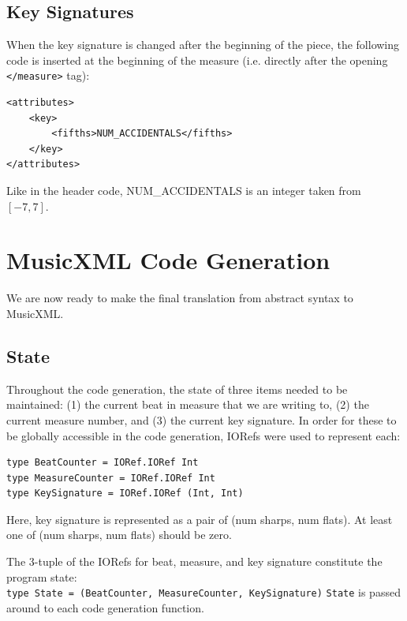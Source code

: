 \documentclass{report}
\begin{document}
\subsection{Key Signatures}
\label{sec:xmlkeysig}
When the  key signature is changed after the beginning of the piece, the following  code is inserted at the beginning of the measure (i.e. directly after the opening \verb.</measure>. tag):

\begin{verbatim}
<attributes>
    <key>
        <fifths>NUM_ACCIDENTALS</fifths>
    </key>
</attributes>
\end{verbatim}

Like in the header code, NUM\_ACCIDENTALS is an integer taken from $[-7,7]$.

\section{MusicXML Code Generation}
We are now ready to make the final translation from abstract syntax to MusicXML.

\subsection{State}
Throughout the code generation, the state of three items needed to be maintained: (1) the current beat in measure that we are writing to, (2) the current measure number, and (3) the current key signature. In order for these to be globally accessible in the code generation, IORefs were used to represent each:
\begin{verbatim}
type BeatCounter = IORef.IORef Int
type MeasureCounter = IORef.IORef Int
type KeySignature = IORef.IORef (Int, Int)
\end{verbatim}

Here, key signature is represented as a pair of (num sharps, num flats). At least one of (num sharps, num flats) should be zero. 

The 3-tuple of the IORefs for beat, measure, and key signature constitute the program state: \\\verb.type State = (BeatCounter, MeasureCounter, KeySignature). \verb.State. is passed around to each code generation function. 
\end{document}
